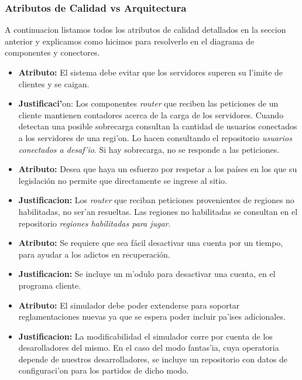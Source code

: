 \subsubsection{Atributos de Calidad vs Arquitectura}
A continuacion listamos todos los atributos de calidad detallados en la seccion anterior y explicamos como hicimos para resolverlo en el diagrama de componentes y conectores.

\begin{itemize}
\item \textbf{Atributo:} El sistema debe evitar que los servidores superen su l'imite de clientes y se caigan.
\item \textbf{Justificaci'}on: Los componentes \textit{router} que reciben las peticiones de un cliente mantienen contadores acerca de la carga de los servidores. Cuando detectan una posible sobrecarga consultan la cantidad de usuarios conectados a los servidores de una regi'on. Lo hacen consultando el repositorio \textit{usuarios conectados a desaf'io}. Si hay sobrecarga, no se responde a las peticiones.

\item \textbf{Atributo:} Desea que haya un esfuerzo por respetar a los países en los que su legislación no permite que directamente se ingrese al sitio.
\item \textbf{Justificacion:} Los \textit{router} que reciban peticiones provenientes de regiones no habilitadas, no ser'an resueltas. Las regiones no habilitadas se consultan en el repositorio \textit{regiones habilitadas para jugar}.

\item \textbf{Atributo:} Se requiere que sea fácil desactivar una cuenta por un tiempo, para ayudar a los adictos en recuperación.
\item \textbf{Justificacion:} Se incluye un m'odulo para desactivar una cuenta, en el programa cliente.

\item \textbf{Atributo:} El simulador debe poder extenderse para soportar reglamentaciones nuevas ya que se espera poder incluir pa'ises adicionales.
\item \textbf{Justificacion:} La modificabilidad el simulador corre por cuenta de los desarolladores del mismo. En el caso del modo fantas'ia, cuya operatoria depende de nuestros desarrolladores, se incluye un repositorio con datos de configuraci'on para los partidos de dicho modo.


\end{itemize}
